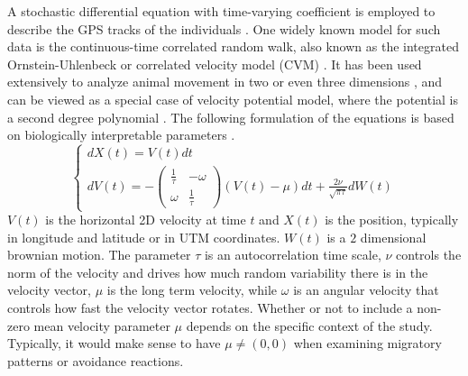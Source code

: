 \documentclass[11pt]{article}
\newcommand {\1}{\mathbb{1}}
\begin{document}
A stochastic differential equation with time-varying coefficient is employed to describe the GPS tracks of the individuals \cite{michelot_varying-coefficient_2021}. One widely known model for such data is the continuous-time correlated random walk, also known as the integrated Ornstein-Uhlenbeck or correlated velocity model (CVM) \cite{johnson_continuoustime_2008}. It has been used extensively to analyze animal movement in two or even three dimensions \cite{johnson_continuoustime_2008,gurarie_correlated_2017,alt_correlation_1990,gurarie_estimating_2011,albertsen_generalizing_2018}, and can be viewed as a special case of velocity potential model, where the potential is a second degree polynomial \cite{preisler_analyzing_2013}. The following formulation of the equations is based on biologically interpretable parameters \cite{gurarie_correlated_2017}.
\begin{equation} \left\{
	\begin{array}{l}
		dX(t)=V(t)dt \\
		dV(t)=-\begin{pmatrix} 
			\frac{1}{\tau} & -\omega \\
			\omega & \frac{1}{\tau}
		\end{pmatrix}(V(t)-\mu)dt+\frac{2\nu}{\sqrt{\pi \tau}} dW(t) 
	\end{array}
	\right.
	\label{eq: RACVM equation}
\end{equation}
$V(t)$ is the horizontal 2D velocity at time $t$ and $X(t)$ is the position, typically in longitude and latitude or in UTM coordinates. $W(t)$ is a $2$ dimensional brownian motion. 
The parameter $\tau$ is an autocorrelation time scale, $\nu$ controls the norm of the velocity and drives how much random variability there is in the velocity vector, $\mu$ is the long term velocity, while $\omega$ is an angular velocity that controls how fast the velocity vector rotates. Whether or not to include a non-zero mean velocity parameter $\mu$ depends on the specific context of the study. Typically, it would make sense to have $\mu\neq (0,0)$ when examining migratory patterns or avoidance reactions.\\
\end{document}
